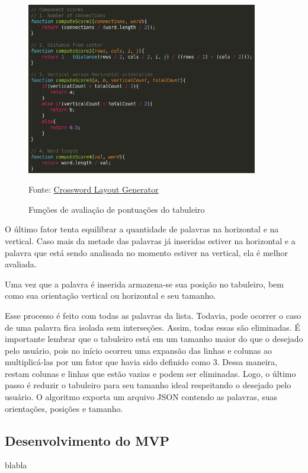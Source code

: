 \begin{figure}[H]
\centering
    \caption{Funções de avaliação de pontuações do tabuleiro}
    \label{fig:codeScores}
    \includegraphics[width=0.9\textwidth]{Figuras/codeScores.png}
    
    Fonte: \href{https://github.com/MichaelWehar/Crossword-Layout-Generator}{Crossword Layout Generator}
\end{figure}

O último fator tenta equilibrar a quantidade de palavras na horizontal e na vertical. Caso mais da metade das palavras já inseridas estiver na horizontal e a palavra que está sendo analisada no momento estiver na vertical, ela é melhor avaliada.

Uma vez que a palavra é inserida armazena-se sua posição no tabuleiro, bem como sua orientação vertical ou horizontal e seu tamanho.

Esse processo é feito com todas as palavras da lista. Todavia, pode ocorrer o caso de uma palavra fica isolada sem interseções. Assim, todas essas são eliminadas. É importante lembrar que o tabuleiro está em um tamanho maior do que o desejado pelo usuário, pois no início ocorreu uma expansão das linhas e colunas ao multiplicá-las por um fator que havia sido definido como 3. Dessa maneira, restam colunas e linhas que estão vazias e podem ser eliminadas. Logo, o último passo é reduzir o tabuleiro para seu tamanho ideal respeitando o desejado pelo usuário. O algoritmo exporta um arquivo JSON contendo as palavras, suas orientações, posições e tamanho.

\subsection{Desenvolvimento do MVP}
blabla